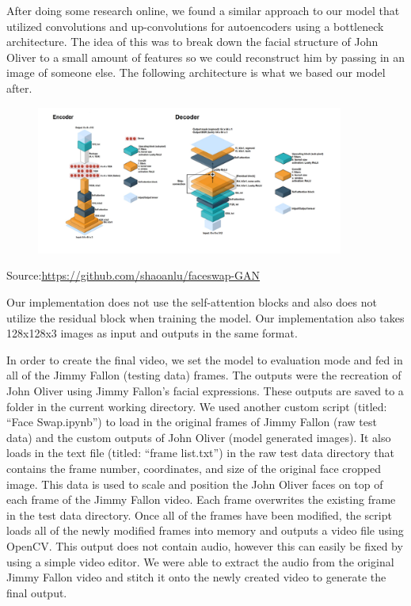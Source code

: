 \documentclass{article}
\begin{document}
After doing some research online, we found a similar approach to our model that utilized convolutions and up-convolutions for autoencoders using a bottleneck architecture. The idea of this was to break down the facial structure of John Oliver to a small amount of features so we could reconstruct him by passing in an image of someone else. 
The following architecture is what we based our model after. 

\begin{figure}[!htbp]
\centering
\includegraphics[width=0.9\textwidth]{encdec.png}
\end{figure}

Source:\href{url}{https://github.com/shaoanlu/faceswap-GAN}

Our implementation does not use the self-attention blocks and also does not utilize the residual block when training the model. Our implementation also takes 128x128x3 images as input and outputs in the same format. 

In order to create the final video, we set the model to evaluation mode and fed in all of the Jimmy Fallon (testing data) frames. The outputs were the recreation of John Oliver using Jimmy Fallon’s facial expressions. These outputs are saved to a folder in the current working directory. We used another custom script (titled: “Face Swap.ipynb”) to load in the original frames of Jimmy Fallon (raw test data) and the custom outputs of John Oliver (model generated images). It also loads in the text file (titled: “frame list.txt”) in the raw test data directory that contains the frame number, coordinates, and size of the original face cropped image. This data is used to scale and position the John Oliver faces on top of each frame of the Jimmy Fallon video. Each frame overwrites the existing frame in the test data directory. Once all of the frames have been modified, the script loads all of the newly modified frames into memory and outputs a video file using OpenCV. This output does not contain audio, however this can easily be fixed by using a simple video editor. We were able to extract the audio from the original Jimmy Fallon video and stitch it onto the newly created video to generate the final output. 
\end{document}

